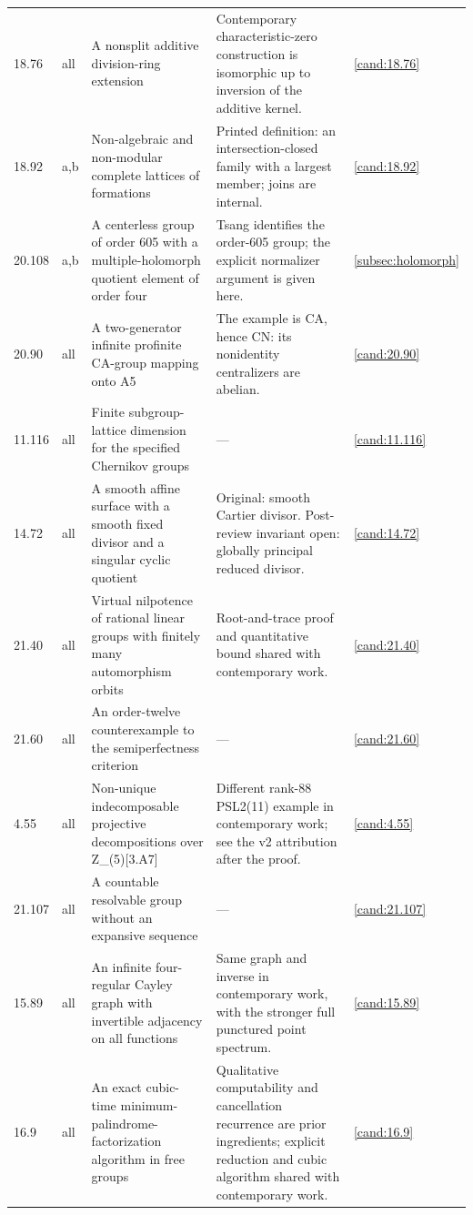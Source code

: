 \begin{longtable}{@{}p{}p{}>{\raggedright\arraybackslash}p{}>{\raggedright\arraybackslash}p{}p{}@{}}
18.76 & all & A nonsplit additive division-ring extension & Contemporary characteristic-zero construction is isomorphic up to inversion of the additive kernel. & \ref{cand:18.76} \\
18.92 & a,b & Non-algebraic and non-modular complete lattices of formations & Printed definition: an intersection-closed family with a largest member; joins are internal. & \ref{cand:18.92} \\
20.108 & a,b & A centerless group of order 605 with a multiple-holomorph quotient element of order four & Tsang identifies the order-605 group; the explicit normalizer argument is given here. & \ref{subsec:holomorph} \\
20.90 & all & A two-generator infinite profinite CA-group mapping onto A5 & The example is CA, hence CN: its nonidentity centralizers are abelian. & \ref{cand:20.90} \\
11.116 & all & Finite subgroup-lattice dimension for the specified Chernikov groups & --- & \ref{cand:11.116} \\
14.72 & all & A smooth affine surface with a smooth fixed divisor and a singular cyclic quotient & Original: smooth Cartier divisor. Post-review invariant open: globally principal reduced divisor. & \ref{cand:14.72} \\
21.40 & all & Virtual nilpotence of rational linear groups with finitely many automorphism orbits & Root-and-trace proof and quantitative bound shared with contemporary work. & \ref{cand:21.40} \\
21.60 & all & An order-twelve counterexample to the semiperfectness criterion & --- & \ref{cand:21.60} \\
4.55 & all & Non-unique indecomposable projective decompositions over Z\_(5)[3.A7] & Different rank-88 PSL2(11) example in contemporary work; see the v2 attribution after the proof. & \ref{cand:4.55} \\
21.107 & all & A countable resolvable group without an expansive sequence & --- & \ref{cand:21.107} \\
15.89 & all & An infinite four-regular Cayley graph with invertible adjacency on all functions & Same graph and inverse in contemporary work, with the stronger full punctured point spectrum. & \ref{cand:15.89} \\
16.9 & all & An exact cubic-time minimum-palindrome-factorization algorithm in free groups & Qualitative computability and cancellation recurrence are prior ingredients; explicit reduction and cubic algorithm shared with contemporary work. & \ref{cand:16.9} \\

\end{longtable}
